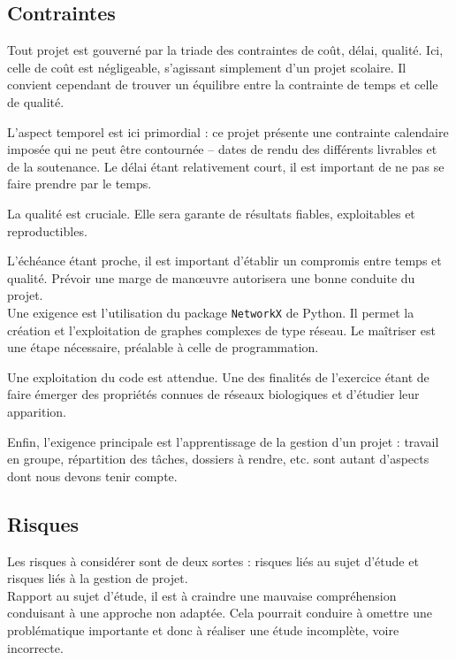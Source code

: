 \subsection{Contraintes}
Tout projet est gouverné par la triade des contraintes de coût, délai, qualité. Ici, celle de coût est négligeable, s'agissant simplement d'un projet scolaire. Il convient cependant de trouver un équilibre entre la contrainte de temps et celle de qualité.

L'aspect temporel est ici primordial : ce projet présente une contrainte calendaire imposée qui ne peut être contournée -- dates de rendu des différents livrables et de la soutenance. Le délai étant relativement court, il est important de ne pas se faire prendre par le temps.

La qualité est cruciale. Elle sera garante de résultats fiables, exploitables et reproductibles. 

L'échéance étant proche, il est important d'établir un compromis entre temps et qualité. Prévoir une marge de manœuvre autorisera une bonne conduite du projet.\\

Une exigence est l'utilisation du package \verb?NetworkX? de Python. Il permet la création et l'exploitation de graphes complexes de type réseau. Le maîtriser est une étape nécessaire, préalable à celle de programmation.

Une exploitation du code est attendue. Une des finalités de l'exercice étant de faire émerger des propriétés connues de réseaux biologiques et d'étudier leur apparition.

Enfin, l'exigence principale est l'apprentissage de la gestion d'un projet : travail en groupe, répartition des tâches, dossiers à rendre, etc. sont autant d'aspects dont nous devons tenir compte.

\subsection{Risques}
Les risques à considérer sont de deux sortes : risques liés au sujet d'étude et risques liés à la gestion de projet.\\

Rapport au sujet d'étude, il est à craindre une mauvaise compréhension conduisant à une approche non adaptée. Cela pourrait conduire à omettre une problématique importante et donc à réaliser une étude incomplète, voire incorrecte.\\


